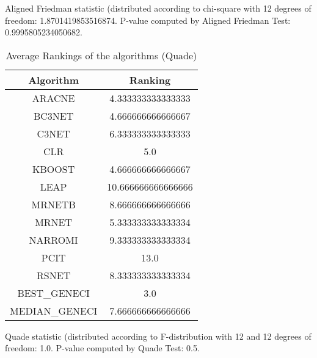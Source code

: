 \documentclass[a4paper,10pt]{article}
\begin{document}
\begin{landscape}
Aligned Friedman statistic (distributed according to chi-square with 12 degrees of freedom: 1.8701419853516874. 
P-value computed by Aligned Friedman Test: 0.9995805234050682.\newline


\newpage

\begin{table}[!htp]
\centering
\caption{Average Rankings of the algorithms (Quade)
}\begin{tabular}{c|c}
Algorithm&Ranking\\
\hline
ARACNE&4.333333333333333\\
BC3NET&4.666666666666667\\
C3NET&6.333333333333333\\
CLR&5.0\\
KBOOST&4.666666666666667\\
LEAP&10.666666666666666\\
MRNETB&8.666666666666666\\
MRNET&5.333333333333334\\
NARROMI&9.333333333333334\\
PCIT&13.0\\
RSNET&8.333333333333334\\
BEST_GENECI&3.0\\
MEDIAN_GENECI&7.666666666666666\\
\end{tabular}
\end{table}
Quade statistic (distributed according to F-distribution with 12 and 12 degrees of freedom: 1.0. 
P-value computed by Quade Test: 0.5.\newline


\newpage


\end{landscape}
\end{document}
